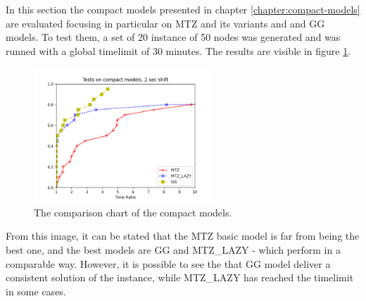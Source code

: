 In this section the compact models presented in chapter \ref{chapter:compact-models} are evaluated focusing in particular on MTZ and its variants and and GG models. To test them, a set of 20 instance of 50 nodes was generated and  was runned with a global timelimit of 30 minutes. The results are visible in figure \ref{fig:result-compact}.

\begin{figure}[h]
	\centering
	\includegraphics[width=0.6\textwidth]{images/final_mtz_mtzlazy_gg.png}
	\caption{The comparison chart of the compact models.}
	\label{fig:result-compact}
\end{figure}

From this image, it can be stated that the MTZ basic model is far from being the best one, and the best models are GG and MTZ\_LAZY - which perform in a comparable way. However, it is possible to see the that GG model deliver a consistent solution of the instance, while MTZ\_LAZY has reached the timelimit in some cases.